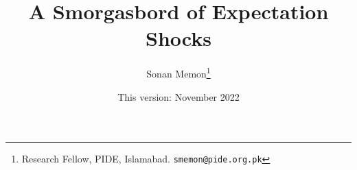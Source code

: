 \documentclass[12pt]{article}
\newcommand{\1}{\mathbbm 1}
\begin{document}
	
	
	
	
	
	
	\vspace{-0.5ex}
	
	
	
	
	
	
	
	
	\newpage{}
	
	
	
	
	
	
	\title{{A Smorgasbord of Expectation Shocks
			}}
			
			
			
			\date{This version: November 2022}%
		
		
		\author{Sonan Memon\footnote{Research Fellow, PIDE, Islamabad. \texttt{smemon@pide.org.pk}}}
		
		
		
		\newpage{}
		
		\maketitle
		\vspace{-2ex}
		
		
		
		
		
		
		
		
		
\end{document}
